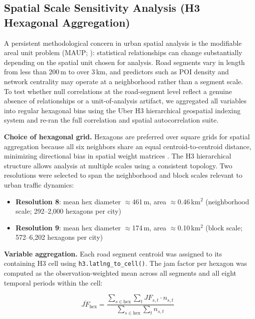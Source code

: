 \documentclass[review,authoryear]{elsarticle}
\begin{document}
\subsection{Spatial Scale Sensitivity Analysis (H3 Hexagonal Aggregation)}
\label{sec:method_h3}

A persistent methodological concern in urban spatial analysis is the modifiable areal unit problem (MAUP; \citealp{Openshaw1984}): statistical relationships can change substantially depending on the spatial unit chosen for analysis. Road segments vary in length from less than 200\,m to over 3\,km, and predictors such as POI density and network centrality may operate at a neighborhood rather than a segment scale. To test whether null correlations at the road-segment level reflect a genuine absence of relationships or a unit-of-analysis artifact, we aggregated all variables into regular hexagonal bins using the Uber H3 hierarchical geospatial indexing system \citep{Brodsky2018} and re-ran the full correlation and spatial autocorrelation suite.

\textbf{Choice of hexagonal grid.} Hexagons are preferred over square grids for spatial aggregation because all six neighbors share an equal centroid-to-centroid distance, minimizing directional bias in spatial weight matrices \citep{Sahr2003}. The H3 hierarchical structure allows analysis at multiple scales using a consistent topology. Two resolutions were selected to span the neighborhood and block scales relevant to urban traffic dynamics:

\begin{itemize}
  \item \textbf{Resolution 8}: mean hex diameter $\approx$461\,m, area $\approx$0.46\,km$^2$ (neighborhood scale; 292--2,000 hexagons per city)
  \item \textbf{Resolution 9}: mean hex diameter $\approx$174\,m, area $\approx$0.10\,km$^2$ (block scale; 572--6,202 hexagons per city)
\end{itemize}

\textbf{Variable aggregation.} Each road segment centroid was assigned to its containing H3 cell using \texttt{h3.latlng\_to\_cell()}. The jam factor per hexagon was computed as the observation-weighted mean across all segments and all eight temporal periods within the cell:

\[\overline{JF}_{\text{hex}} = \frac{\displaystyle\sum_{s \in \text{hex}} \sum_{t} JF_{s,t} \cdot n_{s,t}}{\displaystyle\sum_{s \in \text{hex}} \sum_{t} n_{s,t}}\]
\end{document}

